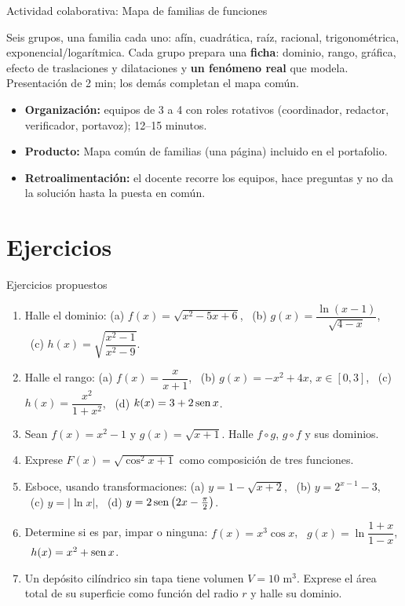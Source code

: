 \documentclass[10pt,aspectratio=169]{beamer}
\begin{document}
\begin{frame}{Actividad colaborativa: Mapa de familias de funciones}
  \small
  \begin{activa}
    Seis grupos, una familia cada uno: afín, cuadrática, raíz, racional, trigonométrica, exponencial/logarítmica. Cada grupo prepara una \textbf{ficha}: dominio, rango, gráfica, efecto de traslaciones y dilataciones y \textbf{un fenómeno real} que modela. Presentación de 2 min; los demás completan el mapa común.
  \end{activa}
  \begin{itemize}
    \item \textbf{Organización:} equipos de 3 a 4 con roles rotativos (coordinador, redactor, verificador, portavoz); 12--15 minutos.
    \item \textbf{Producto:} Mapa común de familias (una página) incluido en el portafolio.
    \item \textbf{Retroalimentación:} el docente recorre los equipos, hace preguntas y no da la solución hasta la puesta en común.
  \end{itemize}
\end{frame}

\section{Ejercicios}

\begin{frame}{Ejercicios propuestos}
  \small
  \begin{ejercicio}
    \begin{enumerate}
      \item Halle el dominio: (a) $f(x)=\sqrt{x^2-5x+6}$, \ (b) $g(x)=\dfrac{\ln(x-1)}{\sqrt{4-x}}$, \ (c) $h(x)=\sqrt{\dfrac{x^2-1}{x^2-9}}$.
      \item Halle el rango: (a) $f(x)=\dfrac{x}{x+1}$, \ (b) $g(x)=-x^2+4x$, $x\in[0,3]$, \ (c) $h(x)=\dfrac{x^2}{1+x^2}$, \ (d) $k(x)=3+2\operatorname{sen} x$.
      \item Sean $f(x)=x^2-1$ y $g(x)=\sqrt{x+1}$. Halle $f\circ g$, $g\circ f$ y sus dominios.
      \item Exprese $F(x)=\sqrt{\cos^2x+1}$ como composición de tres funciones.
      \item Esboce, usando transformaciones: (a) $y=1-\sqrt{x+2}$, \ (b) $y=2^{x-1}-3$, \ (c) $y=|\ln x|$, \ (d) $y=2\operatorname{sen}\left(2x-\frac\pi2\right)$.
      \item Determine si es par, impar o ninguna: $f(x)=x^3\cos x$, \ $g(x)=\ln\dfrac{1+x}{1-x}$, \ $h(x)=x^2+\operatorname{sen} x$.
      \item Un depósito cilíndrico sin tapa tiene volumen $V=10$ m$^3$. Exprese el área total de su superficie como función del radio $r$ y halle su dominio.
    \end{enumerate}
  \end{ejercicio}
\end{frame}
\end{document}

